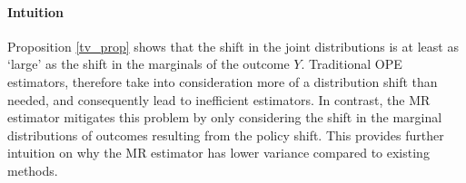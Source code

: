 \paragraph{Intuition}
Proposition \ref{tv_prop} shows that the shift in the joint distributions is at least as `large' as the shift in the marginals of the outcome $Y$. Traditional OPE estimators, therefore take into consideration more of a distribution shift than needed, and consequently lead to inefficient estimators. In contrast, the MR estimator mitigates this problem by only considering the shift in the marginal distributions of outcomes resulting from the policy shift. 
This provides further intuition on why the MR estimator has lower variance compared to existing methods. 


